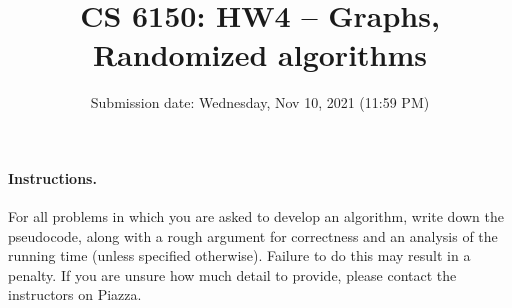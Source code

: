 \documentclass[addpoints, 11pt]{exam}
\title{CS 6150: HW4 -- Graphs, Randomized algorithms}
\date{Submission date: Wednesday, Nov 10, 2021 (11:59 PM)}
\begin{document}
\maketitle
\begin{center}
\end{center}

\pointname{}
\bonuspointname{}
\pointformat{[\bfseries\thepoints]}

\begin{center}
  \gradetable
\end{center}
\newpage
\paragraph{Instructions.}  For all problems in which you are asked to develop an algorithm, write down the pseudocode, along with a rough argument for correctness and an analysis of the running time (unless specified otherwise). Failure to do this may result in a penalty. If you are unsure how much detail to provide, please contact the instructors on Piazza.
\end{document}
